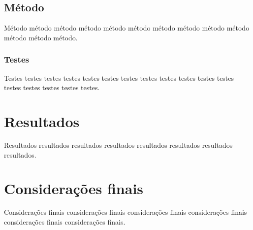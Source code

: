 \documentclass[article,12pt,oneside,a4paper,english,brazil,sumario=tradicional]{abntex2}
\begin{document}
\subsection{M\'etodo}
M\'etodo m\'etodo m\'etodo m\'etodo m\'etodo m\'etodo m\'etodo m\'etodo m\'etodo m\'etodo m\'etodo m\'etodo m\'etodo.

\subsubsection{Testes}
Testes testes testes testes testes testes testes testes testes testes testes testes testes testes testes testes testes.

\section{Resultados}
Resultados resultados resultados resultados resultados resultados resultados resultados.


\section{Considera\c c\~oes finais}
Considera\c c\~oes finais considera\c c\~oes finais considera\c c\~oes finais considera\c c\~oes finais considera\c c\~oes finais considera\c c\~oes finais.

\renewcommand{\bibsection}{\section*{REFER\^ENCIAS BIBLIOGR\'AFICAS}}


\end{document}
